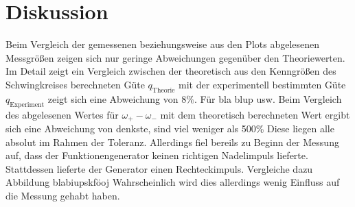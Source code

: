 \section{Diskussion}
\label{sec:Diskussion}
Beim Vergleich der gemessenen beziehungsweise aus den Plots abgelesenen Messgrößen zeigen sich nur geringe Abweichungen gegenüber den Theoriewerten.
Im Detail zeigt ein Vergleich zwischen der theoretisch aus den Kenngrößen des Schwingkreises berechneten Güte $q_\mathrm{Theorie}$ mit der experimentell bestimmten Güte $q_\mathrm{Experiment}$ zeigt sich eine Abweichung von $8\%$.
Für bla blup usw.
Beim Vergleich des abgelesenen Wertes für $\omega_+ - \omega_-$ mit dem theoretisch berechneten Wert ergibt sich eine Abweichung von denkste, sind viel weniger als 500\%
Diese liegen alle absolut im Rahmen der Toleranz.
Allerdings fiel bereils zu Beginn der Messung auf, dass der Funktionengenerator keinen richtigen Nadelimpuls lieferte. Stattdessen lieferte der Generator einen Rechteckimpuls. Vergleiche dazu Abbildung blabiupskföoj
Wahrscheinlich wird dies allerdings wenig Einfluss auf die Messung gehabt haben.
